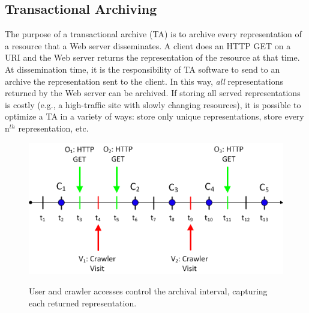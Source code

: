 \documentclass[runningheads,a4paper]{llncs}
\begin{document}
\subsection{Transactional Archiving}
\label{ta}
\vskip -3mm

The purpose of a transactional archive (TA) is to archive every
representation of a resource that a Web server disseminates.  A client
does an HTTP GET on a URI and the Web server returns the representation
of the resource at that time.  At dissemination time, it is the
responsibility of TA software to send to an archive the representation sent to the client.
  In this way, \emph{all}
representations returned by the Web server can be archived.  If storing
all served representations is costly (e.g., a high-traffic site with
slowly changing resources), it is possible to optimize a TA in a
variety of ways: store only unique representations, store every
n$^{th}$ representation, etc.


\begin{figure}[t]
\begin{center}
\includegraphics[width=1\textwidth]{change_timeline_crawler.png}
\caption{User and crawler accesses control the archival interval, capturing each returned representation.}
\vskip -3mm
\label{timeline}
\end{center}
\end{figure}
\end{document}
